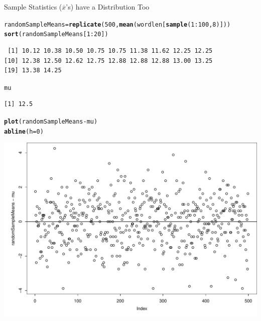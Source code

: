 \documentclass{beamer}\usepackage[]{graphicx}\usepackage[]{color}
\makeatletter
\newcommand{\hlnum}[1]{\textcolor[rgb]{0.2,0.2,0.2}{#1}}%
\newcommand{\hlopt}[1]{\textcolor[rgb]{0.102,0.102,0.102}{#1}}%
\newcommand{\hlstd}[1]{\textcolor[rgb]{0.102,0.102,0.102}{#1}}%
\newcommand{\hlkwb}[1]{\textcolor[rgb]{0.102,0.102,0.102}{#1}}%
\newcommand{\hlkwc}[1]{\textcolor[rgb]{0.2,0.2,0.2}{#1}}%
\newcommand{\hlkwd}[1]{\textcolor[rgb]{0.102,0.102,0.102}{\textbf{#1}}}%
\newenvironment{kframe}{%
 \def\at@end@of@kframe{}%
 \ifinner\ifhmode%
  \def\at@end@of@kframe{\end{minipage}}%
  \begin{minipage}{\columnwidth}%
 \fi\fi%
 \def\FrameCommand##1{\hskip\@totalleftmargin \hskip-\fboxsep
 \colorbox{shadecolor}{##1}\hskip-\fboxsep
     \hskip-\linewidth \hskip-\@totalleftmargin \hskip\columnwidth}%
 \MakeFramed {\advance\hsize-\width
   \@totalleftmargin\z@ \linewidth\hsize
   \@setminipage}}%
 {\par\unskip\endMakeFramed%
 \at@end@of@kframe}
\newenvironment{knitrout}{}{} %
\renewenvironment{knitrout}{\begin{spacing}{0.75}\begin{tiny}}{\end{tiny}\end{spacing}}
\newcommand{\xbar}{\overline{x}}
\makeatother
\begin{document}
\begin{frame}{Sample Statistics ($\xbar$'s) have a Distribution Too\;\;}
\begin{knitrout}\small
{}\color{fgcolor}\begin{kframe}
\begin{alltt}
\hlstd{randomSampleMeans} \hlkwb{=} \hlkwd{replicate}\hlstd{(}\hlnum{500}\hlstd{,} \hlkwd{mean}\hlstd{(wordlen[}\hlkwd{sample}\hlstd{(}\hlnum{1}\hlopt{:}\hlnum{100}\hlstd{,}\hlnum{8}\hlstd{)]) )}
\hlkwd{sort}\hlstd{(randomSampleMeans[}\hlnum{1}\hlopt{:}\hlnum{20}\hlstd{])}
\end{alltt}
\begin{verbatim}
 [1] 10.12 10.38 10.50 10.75 10.75 11.38 11.62 12.25 12.25
[10] 12.38 12.50 12.62 12.75 12.88 12.88 12.88 13.00 13.25
[19] 13.38 14.25
\end{verbatim}
\begin{alltt}
\hlstd{mu}
\end{alltt}
\begin{verbatim}
[1] 12.5
\end{verbatim}
\begin{alltt}
\hlkwd{plot}\hlstd{(randomSampleMeans} \hlopt{-} \hlstd{mu)}
\hlkwd{abline}\hlstd{(}\hlkwc{h}\hlstd{=}\hlnum{0}\hlstd{)}
\end{alltt}
\end{kframe}

{\centering \includegraphics[width=0.99\linewidth]{figure/graphics-unnamed-chunk-35-1} 

}



\end{knitrout}

\newpage


\end{frame}
\end{document}
